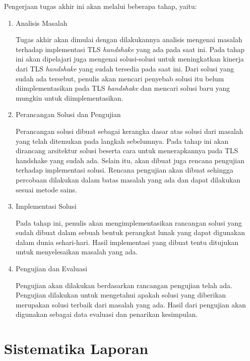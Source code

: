 Pengerjaan tugas akhir ini akan melalui beberapa tahap, yaitu:
\begin{enumerate}
  \item Analisis Masalah

  Tugas akhir akan dimulai dengan dilakukannya analisis mengenai masalah terhadap implementasi TLS \textit{handshake} yang ada pada saat ini. Pada tahap ini akan dipelajari juga mengenai solusi-solusi untuk meningkatkan kinerja dari TLS \textit{handshake} yang sudah tersedia pada saat ini. Dari solusi yang sudah ada tersebut, penulis akan mencari penyebab solusi itu belum diimplementasikan pada TLS \textit{handshake} dan mencari solusi baru yang mungkin untuk diimplementasikan.

  \item Perancangan Solusi dan Pengujian

  Perancangan solusi dibuat sebagai kerangka dasar atas solusi dari masalah yang telah ditemukan pada langkah sebelumnya. Pada tahap ini akan dirancang arsitektur solusi beserta cara untuk menerapkannya pada TLS handshake yang sudah ada. Selain itu, akan dibuat juga rencana pengujian terhadap implementasi solusi. Rencana pengujian akan dibuat sehingga percobaan dilakukan dalam batas masalah yang ada dan dapat dilakukan sesuai metode sains.

  \item Implementasi Solusi

  Pada tahap ini, penulis akan mengimplementasikan rancangan solusi yang sudah dibuat dalam sebuah bentuk perangkat lunak yang dapat digunakan dalam dunia sehari-hari. Hasil implementasi yang dibuat tentu ditujukan untuk menyelesaikan masalah yang ada.

  \item Pengujian dan Evaluasi

  Pengujian akan dilakukan berdasarkan rancangan pengujian telah ada. Pengujian dilakukan untuk mengetahui apakah solusi yang diberikan merupakan solusi terbaik dari masalah yang ada. Hasil dari pengujian akan digunakan sebagai data evaluasi dan penarikan kesimpulan.

\end{enumerate}


\section{Sistematika Laporan}

